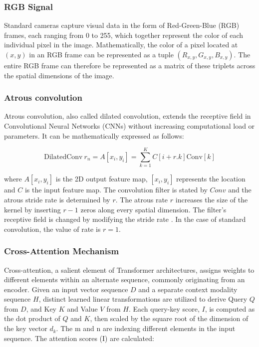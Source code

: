 \documentclass[lettersize,journal]{IEEEtran}
\begin{document}
 

\subsubsection{\textbf{RGB Signal}}

Standard cameras capture visual data in the form of Red-Green-Blue (RGB) frames, each ranging from 0 to 255, which together represent the color of each individual pixel in the image. Mathematically, the color of a pixel located at $(x, y)$ in an RGB frame can be represented as a tuple $(R_{x,y}, G_{x,y}, B_{x,y})$. The entire RGB frame can therefore be represented as a matrix of these triplets across the spatial dimensions of the image.




\subsubsection{\textbf{Atrous convolution}}
Atrous convolution, also called dilated convolution, extends the receptive field in Convolutional Neural Networks (CNNs) without increasing computational load or parameters. It can be mathematically expressed as follows:

\begin{equation}
    \text{DilatedConv}\ {r_n}  = A[{x_i},{y_i}] = \sum_{k=1}^K C[i+r.k] \text{Conv}[k]
    \label{eqn: atrs}
\end{equation}


where $A[{x_i},{y_i}]$ is the 2D output feature map, $[{x_i},{y_i}]$ represents the location and $C$ is the input feature map. The convolution filter is stated by $Conv$ and the atrous stride rate is determined by $r$. The atrous rate $r$ increases the size of the kernel by inserting $r-1$ zeros along every spatial dimension. The filter’s receptive field is changed by modifying the stride rate \cite{Jun2022ACAU-Net:Segmentation}. In the case of standard convolution, the value of rate is $r = 1$. 





\subsubsection{\textbf{Cross-Attention Mechanism}}

Cross-attention, a salient element of Transformer architectures, assigns weights to different elements within an alternate sequence, commonly originating from an encoder. Given an input vector sequence $D$ and a separate context modality sequence $H$, distinct learned linear transformations are utilized to derive Query $Q$ from $D$, and Key $K$ and Value $V$ from $H$. Each query-key score, $I$, is computed as the dot product of $Q$ and $K$, then scaled by the square root of the dimension of the key vector $d_k$. The m and n are indexing different elements in the input sequence. The attention scores (I) are calculated:
\end{document}
